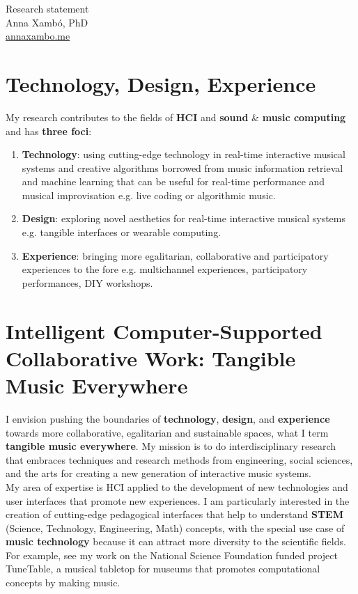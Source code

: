 \documentclass[10pt, a4paper]{article}
\begin{document}
{\LARGE Research statement}\\[0.2cm]
Anna Xambó, PhD\\
\href{http://annaxambo.me}{annaxambo.me}

\section*{Technology, Design, Experience}

My research contributes to the fields of \textbf{HCI} and \textbf{sound} \& \textbf{music computing} and has \textbf{three foci}:

\begin{enumerate}
\item \textbf{Technology}: using cutting-edge technology in real-time interactive musical systems and creative algorithms borrowed from music information retrieval and machine learning that can be useful for real-time performance and musical improvisation e.g. live coding or algorithmic music.
\item \textbf{Design}: exploring novel aesthetics for real-time interactive musical systems e.g. tangible interfaces or wearable computing. 
\item \textbf{Experience}: bringing more egalitarian, collaborative and participatory experiences to the fore e.g. multichannel experiences, participatory performances, DIY workshops. 
\end{enumerate}

\section*{Intelligent Computer-Supported Collaborative Work: Tangible Music Everywhere}

I envision pushing the boundaries of \textbf{technology}, \textbf{design}, and \textbf{experience} towards more collaborative, egalitarian and sustainable spaces, what I term \textbf{tangible music everywhere}. My mission is to do interdisciplinary research that embraces techniques and research methods from engineering, social sciences, and the arts for creating a new generation of interactive music systems.\\

My area of expertise is HCI applied to the development of new technologies and user interfaces that promote new experiences. I am particularly interested in the creation of cutting-edge pedagogical interfaces that help to understand \textbf{STEM} (Science, Technology, Engineering, Math) concepts, with the special use case of \textbf{music technology} because it can attract more diversity to the scientific fields. For example, see my work on the National Science Foundation funded project TuneTable, a musical tabletop for museums that promotes computational concepts by making music.\\
\end{document}
